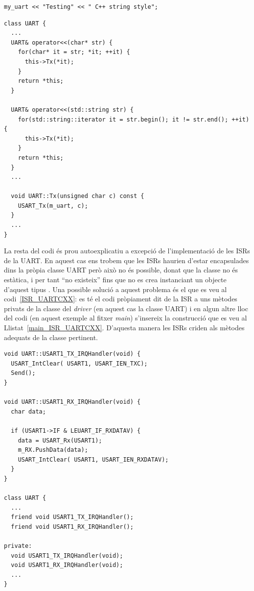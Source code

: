 \begin{lstlisting}[style=customc,caption=Ús de l'operador <{}< de la classe UART,label=operator_UARTCXX_example]
  my_uart << "Testing" << " C++ string style";
\end{lstlisting}


\begin{lstlisting}[style=customc,caption=Implementació de l'operador <{}< per la classe UART,label=operator_UARTCXX]
class UART {
  ...
  UART& operator<<(char* str) {
    for(char* it = str; *it; ++it) {
      this->Tx(*it);
    }
    return *this;
  }

  UART& operator<<(std::string str) {
    for(std::string::iterator it = str.begin(); it != str.end(); ++it) {
      this->Tx(*it);
    }
    return *this;
  }
  ...

  void UART::Tx(unsigned char c) const {
    USART_Tx(m_uart, c);
  }
  ...
}

\end{lstlisting}

La resta del codi és prou autoexplicatiu a excepció de l'implementació de les \glspl{ISR} de la UART. En aquest cas ens trobem que les \glspl{ISR} haurien d'estar encapsulades dins la pròpia classe UART però això no és possible, donat que la classe no és estàtica, i per tant ``no existeix'' fins que no es crea instanciant un objecte d'aquest tipus \cite{ISRCXX}\cite{ISRCXX_2}. Una possible solució a aquest problema és el que es veu al codi~\ref{ISR_UARTCXX}: es té el codi pròpiament dit de la \gls{ISR} a uns mètodes privats de la classe del {\em driver} (en aquest cas la classe UART) i en algun altre lloc del codi (en aquest exemple al fitxer {\em main}) s'insereix la construcció que es veu al Llistat~\ref{main_ISR_UARTCXX}. D'aquesta manera les \glspl{ISR} criden als mètodes adequats de la classe pertinent.

\begin{lstlisting}[style=customc,caption=Implementació de les ISRs en C++,label=ISR_UARTCXX]
void UART::USART1_TX_IRQHandler(void) {
  USART_IntClear( USART1, USART_IEN_TXC);
  Send();
}

void UART::USART1_RX_IRQHandler(void) {
  char data;

  if (USART1->IF & LEUART_IF_RXDATAV) {
    data = USART_Rx(USART1);
    m_RX.PushData(data);
    USART_IntClear( USART1, USART_IEN_RXDATAV);
  }
}

class UART {
  ...
  friend void USART1_TX_IRQHandler();
  friend void USART1_RX_IRQHandler();

private:
  void USART1_TX_IRQHandler(void);
  void USART1_RX_IRQHandler(void);
  ...
}
\end{lstlisting}

